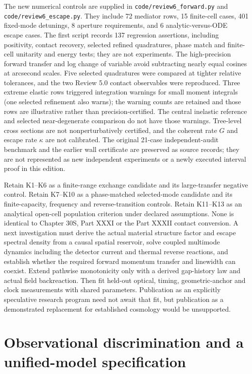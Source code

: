 \documentclass[
  11pt,
  twoside]{article}
\begin{document}
The new numerical controls are supplied in
\nolinkurl{code/review6_forward.py} and
\nolinkurl{code/review6_escape.py}. They include 72 mediator rows, 15
finite-cell cases, 401 fixed-mode detunings, 8 aperture requirements,
and 6 analytic-versus-ODE escape cases. The first script records 137
regression assertions, including positivity, contact recovery, selected
refined quadratures, phase match and finite-cell unitarity and energy
tests; they are not experiments. The high-precision forward transfer and
log change of variable avoid subtracting nearly equal cosines at
arcsecond scales. Five selected quadratures were compared at tighter
relative tolerances, and the two Review 5.0 contact observables were
reproduced. Three extreme elastic rows triggered integration warnings
for small moment integrals (one selected refinement also warns); the
warning counts are retained and those rows are illustrative rather than
precision-certified. The central inelastic reference and selected
near-degenerate comparison do not have those warnings. Tree-level cross
sections are not nonperturbatively certified, and the coherent rate
\(G\) and escape rate \(\kappa\) are not calibrated. The original
21-case independent-audit benchmark and the earlier wall certificate are
preserved as source records; they are not represented as new independent
experiments or a newly executed interval proof in this edition.

Retain K1--K6 as a finite-range exchange candidate and its
large-transfer negative control. Retain K7--K10 as a phase-matched
selected-mode candidate and its finite-capacity, frequency and
reverse-transition controls. Retain K11--K13 as an analytical open-cell
population criterion under declared assumptions. None is identical to
Chapter 30S, Part XXXI or the Part XXXII contact conversion. A next
investigation must derive the actual material structure factor and
escape spectral density from a causal spatial reservoir, solve coupled
multimode dynamics including the detector current and thermal reverse
reactions, and establish whether the required forward momentum transfer
and linewidth can coexist. Extend pathwise monotonicity only with a
derived gap-history law and actual field backreaction. Then fit held-out
optical, timing, geometric-anchor and clock measurements with shared
parameters. Publication as an explicitly speculative research program
need not await that fit, but publication as a demonstrated replacement
for established cosmology would be unsupported.

\section{Observational discrimination and a unified-model
specification}\label{observational-discrimination-and-a-unified-model-specification}
\end{document}
